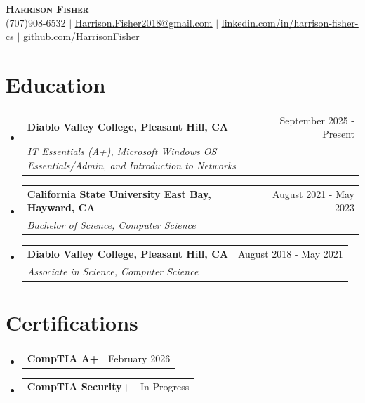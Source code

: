 \documentclass[letterpaper, 11pt]{article}
\makeatletter
\newcommand{\resumeSubheading}[4]{
  \vspace{-2pt}\item
    \begin{tabular*}{0.97\textwidth}[t]{l@{\extracolsep{\fill}}r}
      \textbf{#1} & #2 \\
      \textit{\small#3} & \textit{\small #4} \\
    \end{tabular*}\vspace{-7pt}
}
\newcommand{\resumeSubHeadingListStart}{\begin{itemize}[leftmargin=0.15in, label={}]}
\newcommand{\resumeSubHeadingListEnd}{\end{itemize}}
\newcommand{\resumeCert}[2]{
  \item
  \begin{tabular*}{0.97\textwidth}[t]{l@{\extracolsep{\fill}}r}
    \textbf{#1} & #2 \\
  \end{tabular*}\vspace{-4pt}
}
\makeatother
\begin{document}

\begin{center}
    \textbf{\Huge \scshape Harrison Fisher} \\ \vspace{7pt}
    \small (707)908-6532 $ | $ 
    \href{Harrison.Fisher2018@gmail.com}{\underline{Harrison.Fisher2018@gmail.com}} $ | $ 
    \href{https://www.linkedin.com/in/harrison-fisher-cs/}{\underline{\faLinkedin \hspace{1pt} linkedin.com/in/harrison-fisher-cs}} $ | $
    \href{https://github.com/HarrisonFisher}{\underline{\faGithub \hspace{1pt} github.com/HarrisonFisher}}
\end{center}



  

\section{Education}
  \resumeSubHeadingListStart

   \resumeSubheading
      {Diablo Valley College, Pleasant Hill, CA}{September 2025 - Present}
      {IT Essentials (A+), Microsoft Windows OS Essentials/Admin, and Introduction to Networks}{}
      
    \resumeSubheading
      {California State University East Bay, Hayward, CA}{August 2021 - May 2023}
      {Bachelor of Science, Computer Science}{}

    \resumeSubheading
      {Diablo Valley College, Pleasant Hill, CA}{August 2018 - May 2021}
      {Associate in Science, Computer Science}{}
  \resumeSubHeadingListEnd
\section{Certifications}
\resumeSubHeadingListStart
  \resumeCert{CompTIA A+}{February 2026}
  \resumeCert{CompTIA Security+}{In Progress}
\resumeSubHeadingListEnd
\end{document}

